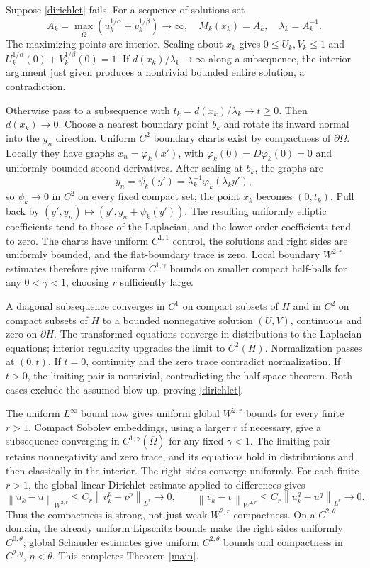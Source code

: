\documentclass[11pt]{article}
\newcommand{\norm}[1]{\left\lVert#1\right\rVert}
\begin{document}
Suppose \eqref{dirichlet} fails. For a sequence of solutions set
\[
 A_k=\max_{\overline\Omega}
       (u_k^{1/\alpha}+v_k^{1/\beta})\longrightarrow\infty,
 \quad M_k(x_k)=A_k,\quad \lambda_k=A_k^{-1}.
\]
The maximizing points are interior. Scaling about $x_k$ gives
$0\le U_k,V_k\le1$ and
$U_k^{1/\alpha}(0)+V_k^{1/\beta}(0)=1$.
If $d(x_k)/\lambda_k\to\infty$ along a subsequence, the interior
argument just given produces a nontrivial bounded entire solution,
a contradiction.

Otherwise pass to a subsequence with
$t_k=d(x_k)/\lambda_k\to t\ge0$. Then $d(x_k)\to0$.
Choose a nearest boundary point $b_k$ and rotate its inward normal
into the $y_n$ direction. Uniform $C^2$ boundary charts exist by
compactness of $\partial\Omega$. Locally they have graphs
$x_n=\varphi_k(x')$, with $\varphi_k(0)=D\varphi_k(0)=0$ and
uniformly bounded second derivatives. After scaling at $b_k$, the
graphs are
\[
 y_n=\psi_k(y')=\lambda_k^{-1}\varphi_k(\lambda_k y'),
\]
so $\psi_k\to0$ in $C^2$ on every fixed compact set; the point $x_k$
becomes $(0,t_k)$. Pull back by
$(y',y_n)\mapsto(y',y_n+\psi_k(y'))$.
The resulting uniformly elliptic coefficients tend to those of the
Laplacian, and the lower order coefficients tend to zero.
The charts have uniform $C^{1,1}$ control, the solutions and right
sides are uniformly bounded, and the flat-boundary trace is zero.
Local boundary $W^{2,r}$ estimates therefore give uniform
$C^{1,\gamma}$ bounds on smaller compact half-balls for any
$0<\gamma<1$, choosing $r$ sufficiently large.

A diagonal subsequence converges in $C^1$ on compact subsets of
$\overline H$ and in $C^2$ on compact subsets of $H$ to a bounded
nonnegative solution $(U,V)$, continuous and zero on $\partial H$.
The transformed equations converge in distributions to the Laplacian
equations; interior regularity upgrades the limit to $C^2(H)$.
Normalization passes at $(0,t)$. If $t=0$, continuity and the zero
trace contradict normalization. If $t>0$, the limiting pair is
nontrivial, contradicting the half-space theorem. Both cases exclude
the assumed blow-up, proving \eqref{dirichlet}.

The uniform $L^\infty$ bound now gives uniform global $W^{2,r}$ bounds
for every finite $r>1$. Compact Sobolev embeddings, using a larger
$r$ if necessary, give a subsequence converging in
$C^{1,\gamma}(\overline\Omega)$ for any fixed $\gamma<1$.
The limiting pair retains nonnegativity and zero trace, and its equations
hold in distributions and then classically in the interior. The right
sides converge uniformly. For each finite $r>1$, the global linear
Dirichlet estimate applied to differences gives
\[
 \norm{u_k-u}_{W^{2,r}}\le C_r\norm{v_k^p-v^p}_{L^r}\to0,
 \qquad
 \norm{v_k-v}_{W^{2,r}}\le C_r\norm{u_k^q-u^q}_{L^r}\to0.
\]
Thus the compactness is strong, not just weak $W^{2,r}$ compactness.
On a $C^{2,\theta}$ domain, the already uniform Lipschitz bounds make
the right sides uniformly $C^{0,\theta}$; global Schauder estimates
give uniform $C^{2,\theta}$ bounds and compactness in $C^{2,\eta}$,
$\eta<\theta$. This completes Theorem \ref{main}.
\end{document}

